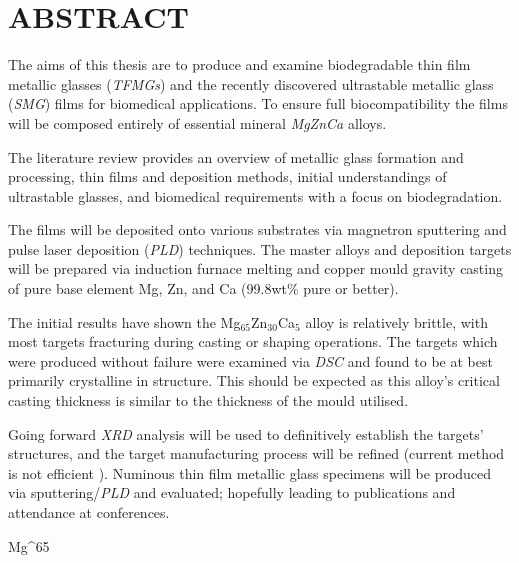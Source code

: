 \section{ABSTRACT}
 
The aims of this thesis are to produce and examine biodegradable thin film metallic glasses (\textit{TFMGs}) and the recently discovered ultrastable metallic glass (\textit{SMG}) films for biomedical applications. To ensure full biocompatibility the films will be composed entirely of essential mineral \textit{MgZnCa} alloys.

The literature review provides an overview of metallic glass formation and processing, thin films and deposition methods, initial understandings of ultrastable glasses, and biomedical requirements with a focus on biodegradation. 

The films will be deposited onto various substrates via magnetron sputtering and pulse laser deposition (\textit{PLD}) techniques. The master alloys and deposition targets will be prepared via induction furnace melting and copper mould gravity casting of pure base element Mg, Zn, and Ca (99.8wt\% pure or better).

The initial results have shown the Mg$_{65}$Zn$_{30}$Ca$_{5}$ alloy is relatively brittle, with most targets fracturing during casting or shaping operations. The targets which were produced without failure were examined via \textit{DSC} and found to be at best primarily crystalline in structure. This should be expected as this alloy’s critical casting thickness is similar to the thickness of the mould utilised. 

Going forward \textit{XRD} analysis will be used to definitively establish the targets’ structures, and the target manufacturing process will be refined (current method is not efficient ). Numinous thin film metallic glass specimens will be produced via sputtering/\textit{PLD} and evaluated; hopefully leading to publications and attendance at conferences. 

Mg^{65}